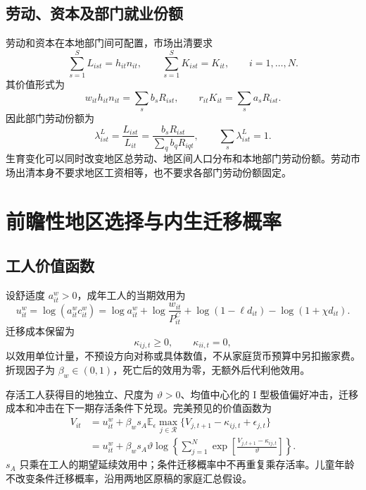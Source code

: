 \documentclass[UTF8,a4paper,zihao=-4,fontset=windows]{ctexart}
\numberwithin{equation}{section}
\newcommand{\E}{\mathbb{E}}
\newcommand{\pc}{P^{C}}
\begin{document}
\subsection{劳动、资本及部门就业份额}
劳动和资本在本地部门间可配置，市场出清要求
\begin{equation}
 \sum_{s=1}^SL_{ist}=h_{it}n_{it},\qquad
 \sum_{s=1}^SK_{ist}=K_{it},\qquad i=1,\ldots,N.
 \label{eq:lg-factor-clearing}
\end{equation}
其价值形式为
\begin{equation}
 w_{it}h_{it}n_{it}=\sum_sb_sR_{ist},\qquad
 r_{it}K_{it}=\sum_sa_sR_{ist}.
 \label{eq:lg-factor-clearing-value}
\end{equation}
因此部门劳动份额为
\begin{equation}
 \lambda^L_{ist}=\frac{L_{ist}}{L_{it}}
 =\frac{b_sR_{ist}}{\sum_qb_qR_{iqt}},\qquad\sum_s\lambda^L_{ist}=1.
 \label{eq:lg-sector-employment}
\end{equation}
生育变化可以同时改变地区总劳动、地区间人口分布和本地部门劳动份额。劳动市场出清本身不要求地区工资相等，也不要求各部门劳动份额固定。

\section{前瞻性地区选择与内生迁移概率}
\label{sec:lg-migration}

\subsection{工人价值函数}
设舒适度 $a^w_{it}>0$，成年工人的当期效用为
\begin{equation}
 u^w_{it}=\log(a^w_{it}c^w_{it})
 =\log a^w_{it}+\log\frac{w_{it}}{\pc_{it}}
 +\log(1-\ell d_{it})-\log(1+\chi d_{it}).
 \label{eq:lg-worker-flow}
\end{equation}
迁移成本保留为
\begin{equation}
 \kappa_{ij,t}\geq0,\qquad\kappa_{ii,t}=0,
 \label{eq:lg-migration-cost}
\end{equation}
以效用单位计量，不预设方向对称或具体数值，不从家庭货币预算中另扣搬家费。折现因子为 $\beta_w\in(0,1)$，死亡后的效用为零，无额外后代利他效用。

存活工人获得目的地独立、尺度为 $\vartheta>0$、均值中心化的 I 型极值偏好冲击，迁移成本和冲击在下一期存活条件下兑现。完美预见的价值函数为
\begin{align}
 V_{it}&=u^w_{it}+\beta_ws_A\E_\epsilon
 \max_{j\in\mathcal R}\{V_{j,t+1}-\kappa_{ij,t}+\epsilon_{j,t}\}\\
 &=u^w_{it}+\beta_ws_A\vartheta
 \log\left\{\sum_{j=1}^N\exp\left[
 \frac{V_{j,t+1}-\kappa_{ij,t}}{\vartheta}\right]\right\}.
 \label{eq:lg-bellman}
\end{align}
$s_A$ 只乘在工人的期望延续效用中；条件迁移概率中不再重复乘存活率。儿童年龄不改变条件迁移概率，沿用两地区原稿的家庭汇总假设。
\end{document}
